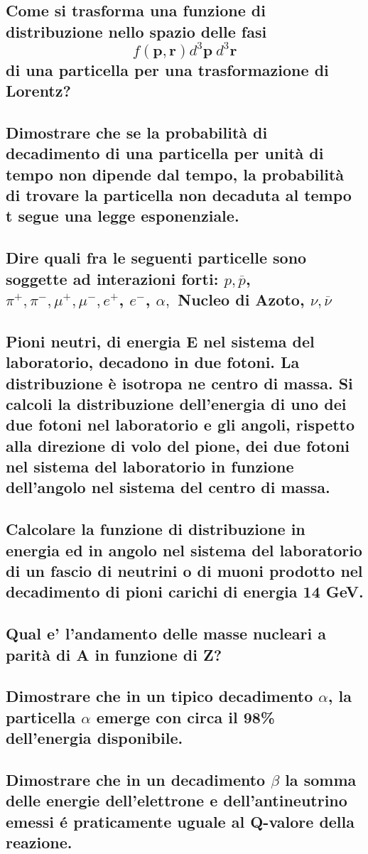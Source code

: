 \subsection[]{ Come si trasforma una funzione di distribuzione nello spazio delle fasi 
\[
	f\left(\boldsymbol{p},\boldsymbol{r}\right)d^3 \boldsymbol{p} \ d^3 \boldsymbol{r} 
\]
di una particella per una trasformazione di Lorentz?}

\subsection[]{ Dimostrare che se la probabilità di decadimento di una particella per unità di tempo non dipende dal tempo, la probabilità di trovare la particella non decaduta al tempo t segue una legge esponenziale.}

\subsection[]{ Dire quali fra le seguenti particelle sono soggette ad interazioni forti: $ p, \overline{p} $, $\pi^{+}, \pi^{-}, \mu^{+}, \mu^{-}, e^{+}$, $e^{-}$, $\alpha,$ Nucleo di Azoto, $\nu, \overline{\nu}$ }

\subsection[]{ Pioni neutri, di energia E nel sistema del laboratorio, decadono in due fotoni. La distribuzione è isotropa ne centro di massa. Si calcoli la distribuzione dell’energia di uno dei due fotoni nel laboratorio e gli angoli, rispetto alla direzione di volo del pione, dei due fotoni nel sistema del laboratorio in funzione dell’angolo nel sistema del centro di massa.}

\subsection[]{ Calcolare la funzione di distribuzione in energia ed in angolo nel sistema del laboratorio di un fascio di neutrini o di muoni prodotto nel decadimento di pioni carichi di energia 14 GeV.}

\subsection[]{ Qual e' l'andamento delle masse nucleari a parità di A in funzione di Z?}

\subsection[]{ Dimostrare che in un tipico decadimento $\alpha$, la particella $\alpha$ emerge con circa il 98\% dell'energia disponibile.}

\subsection[]{ Dimostrare che in un decadimento $\beta$ la somma delle energie dell'elettrone e dell'antineutrino emessi é praticamente uguale al Q-valore della reazione.}
